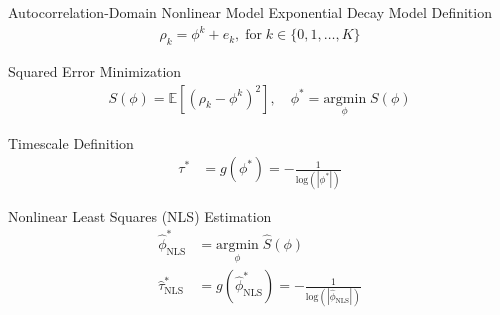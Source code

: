 \documentclass[8pt,aspectratio=169]{beamer}
\begin{document}
\begin{frame}{Autocorrelation-Domain Nonlinear Model}
\vfill
Exponential Decay Model Definition
\begin{align}\label{eq:nlm}
    \rho_k = \phi^k + e_k, \; \text{for}\; k \in \{0, 1, \ldots, K\}
\end{align}

Squared Error Minimization
\begin{align}\label{eq:nlm_loss}
    S(\phi) = \mathbb{E}[(\rho_k - \phi^k)^2], \quad \phi^* = \underset{\phi}{\text{argmin}} \; S(\phi)
\end{align}

Timescale Definition
\begin{align}
    \tau^* &= g(\phi^*) = -\frac{1}{\text{log}(|\phi^*|)} \label{eq:nlm-tau}
\end{align}

Nonlinear Least Squares (NLS) Estimation
\begin{align}
    \hat \phi^*_{\scriptscriptstyle\text{NLS}} &= \underset{\phi}{\text{argmin}} \; \widehat{S}(\phi) \label{eq:nls_phi_}\\
    \hat \tau^*_{\scriptscriptstyle\text{NLS}} &= g(\hat \phi^*_{\scriptscriptstyle\text{NLS}}) = -\frac{1}{\text{log}(|\hat\phi_{\scriptscriptstyle\text{NLS}}|)}
\end{align}

\end{frame}
\end{document}

